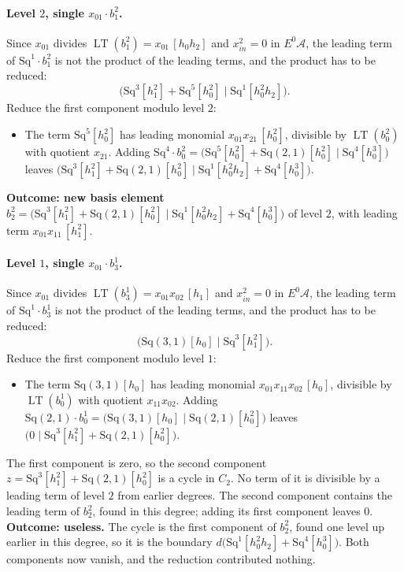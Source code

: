 \documentclass[11pt]{article}
\newcommand{\Sq}{\mathrm{Sq}}
\newcommand{\A}{\mathcal{A}}
\DeclareMathOperator{\LT}{LT}
\begin{document}
\paragraph{Level $2$, single $x_{01}\cdot b^{2}_{1}$.} Since $x_{01}$ divides $\LT(b^{2}_{1}) = x_{01}\,[h_0h_2]$ and $x_{in}^2 = 0$ in $E^0\A$, the leading term of $\Sq^{1}\cdot b^{2}_{1}$ is not the product of the leading terms, and the product has to be reduced:
\[\bigl(\Sq^{3}[h_1^2] + \Sq^{5}[h_0^2] \;\big|\; \Sq^{1}[h_0^2h_2]\bigr).\]
Reduce the first component modulo level $2$:
\begin{itemize}
\item The term $\Sq^{5}[h_0^2]$ has leading monomial $x_{01}x_{21}\,[h_0^2]$, divisible by $\LT(b^{2}_{0})$ with quotient $x_{21}$. Adding $\Sq^{4}\cdot b^{2}_{0} = \bigl(\Sq^{5}[h_0^2] + \Sq(2,1)[h_0^2] \;\big|\; \Sq^{4}[h_0^3]\bigr)$ leaves $\bigl(\Sq^{3}[h_1^2] + \Sq(2,1)[h_0^2] \;\big|\; \Sq^{1}[h_0^2h_2] + \Sq^{4}[h_0^3]\bigr)$.
\end{itemize}
\textbf{Outcome: new basis element} $b^{2}_{2} = \bigl(\Sq^{3}[h_1^2] + \Sq(2,1)[h_0^2] \;\big|\; \Sq^{1}[h_0^2h_2] + \Sq^{4}[h_0^3]\bigr)$ of level $2$, with leading term $x_{01}x_{11}\,[h_1^2]$.
\medskip
\paragraph{Level $1$, single $x_{01}\cdot b^{1}_{3}$.} Since $x_{01}$ divides $\LT(b^{1}_{3}) = x_{01}x_{02}\,[h_1]$ and $x_{in}^2 = 0$ in $E^0\A$, the leading term of $\Sq^{1}\cdot b^{1}_{3}$ is not the product of the leading terms, and the product has to be reduced:
\[\bigl(\Sq(3,1)[h_0] \;\big|\; \Sq^{3}[h_1^2]\bigr).\]
Reduce the first component modulo level $1$:
\begin{itemize}
\item The term $\Sq(3,1)[h_0]$ has leading monomial $x_{01}x_{11}x_{02}\,[h_0]$, divisible by $\LT(b^{1}_{0})$ with quotient $x_{11}x_{02}$. Adding $\Sq(2,1)\cdot b^{1}_{0} = \bigl(\Sq(3,1)[h_0] \;\big|\; \Sq(2,1)[h_0^2]\bigr)$ leaves $\bigl(0 \;\big|\; \Sq^{3}[h_1^2] + \Sq(2,1)[h_0^2]\bigr)$.
\end{itemize}
The first component is zero, so the second component $z = \Sq^{3}[h_1^2] + \Sq(2,1)[h_0^2]$ is a cycle in $C_{2}$.
No term of it is divisible by a leading term of level $2$ from earlier degrees.
The second component contains the leading term of $b^{2}_{2}$, found in this degree; adding its first component leaves $0$.
\textbf{Outcome: useless.} The cycle is the first component of $b^{2}_{2}$, found one level up earlier in this degree, so it is the boundary $d\bigl(\Sq^{1}[h_0^2h_2] + \Sq^{4}[h_0^3]\bigr)$. Both components now vanish, and the reduction contributed nothing.
\medskip
\end{document}
